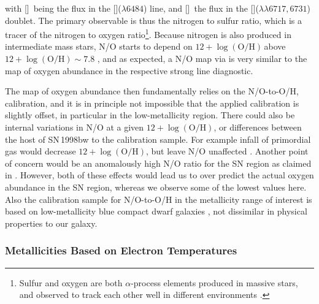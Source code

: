 \documentclass[traditabstract]{aa}
\newcommand{\oh}{12+\log(\mathrm{O/H})}
\newcommand{\sii}{[\ion{S}{ii}]}
\newcommand{\nii}{[\ion{N}{ii}]}
\begin{document}
with \nii\, being the flux in the \nii($\lambda6484$) line, and \sii\, the flux in the \sii($\lambda\lambda6717,6731$) doublet. The primary observable is thus the nitrogen to sulfur ratio, which is a tracer of the nitrogen to oxygen ratio\footnote{Sulfur and oxygen are both $\alpha$-process elements produced in massive stars, and observed to track each other well in different environments \citep[see e.g. Figure 6 in][]{2006A&A...448..955I}.}. Because nitrogen is also produced in intermediate mass stars, N/O starts to depend on $\oh$\,above $\oh\sim 7.8$ \citep[e.g.][]{1999ApJ...511..639I, 2013A&A...549A..25P, 2016A&A...595A..62P}, and as expected, a N/O map via \citet{2010ApJ...715L.128A} is very similar to the map of oxygen abundance in the respective strong line diagnostic.

The map of oxygen abundance then fundamentally relies on the N/O-to-O/H, calibration, and it is in principle not impossible that the applied calibration is slightly offset, in particular in the low-metallicity region. There could also be internal variations in N/O at a given $\oh$, or differences between the host of SN\,1998bw to the calibration sample. For example infall of primordial gas would decrease $\oh$, but leave N/O unaffected \citep{2016ApJ...823L..24K}. Another point of concern would be an anomalously high N/O ratio for the SN region as claimed in \citet{2006A&A...454..103H}. However, both of these effects would lead us to over predict the actual oxygen abundance in the SN region, whereas we observe some of the lowest values here. Also the calibration sample for N/O-to-O/H in the metallicity range of interest is based on low-metallicity blue compact dwarf galaxies \citep{1999ApJ...511..639I}, not dissimilar in physical properties to our galaxy.


\subsubsection{Metallicities Based on Electron Temperatures}
\end{document}

